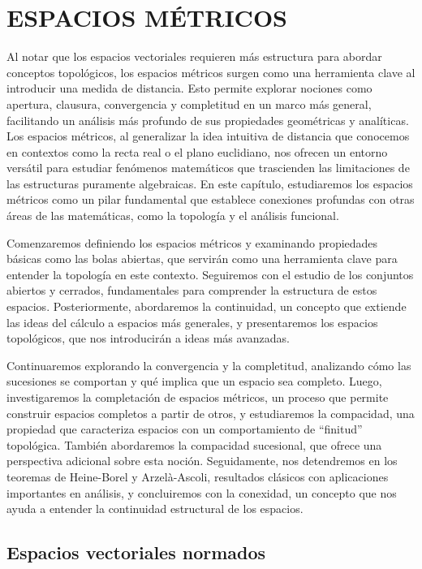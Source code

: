 \chapter{ESPACIOS MÉTRICOS}
\printchaptertableofcontents

Al notar que los espacios vectoriales requieren más estructura para abordar conceptos topológicos, los espacios métricos surgen como una herramienta clave al introducir una medida de distancia. Esto permite explorar nociones como apertura, clausura, convergencia y completitud en un marco más general, facilitando un análisis más profundo de sus propiedades geométricas y analíticas. Los espacios métricos, al generalizar la idea intuitiva de distancia que conocemos en contextos como la recta real o el plano euclidiano, nos ofrecen un entorno versátil para estudiar fenómenos matemáticos que trascienden las limitaciones de las estructuras puramente algebraicas. En este capítulo, estudiaremos los espacios métricos como un pilar fundamental que establece conexiones profundas con otras áreas de las matemáticas, como la topología y el análisis funcional.

Comenzaremos definiendo los espacios métricos y examinando propiedades básicas como las bolas abiertas, que servirán como una herramienta clave para entender la topología en este contexto. Seguiremos con el estudio de los conjuntos abiertos y cerrados, fundamentales para comprender la estructura de estos espacios. Posteriormente, abordaremos la continuidad, un concepto que extiende las ideas del cálculo a espacios más generales, y presentaremos los espacios topológicos, que nos introducirán a ideas más avanzadas.

Continuaremos explorando la convergencia y la completitud, analizando cómo las sucesiones se comportan y qué implica que un espacio sea completo. Luego, investigaremos la completación de espacios métricos, un proceso que permite construir espacios completos a partir de otros, y estudiaremos la compacidad, una propiedad que caracteriza espacios con un comportamiento de “finitud” topológica. También abordaremos la compacidad sucesional, que ofrece una perspectiva adicional sobre esta noción. Seguidamente, nos detendremos en los teoremas de Heine-Borel y Arzelà-Ascoli, resultados clásicos con aplicaciones importantes en análisis, y concluiremos con la conexidad, un concepto que nos ayuda a entender la continuidad estructural de los espacios.

\newpage

\section{Espacios vectoriales normados}

